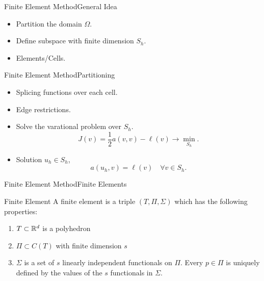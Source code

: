 \begin{frame}{Finite Element Method}{General Idea}
    \begin{itemize}
        \item Partition the domain $\Omega$.
        \item Define subspace with finite dimension $S_h$.
        \item Elements/Cells.
    \end{itemize}
\end{frame}

\begin{frame}{Finite Element Method}{Partitioning}
    \begin{itemize}
        \item Splicing functions over each cell.
        \item Edge restrictions.
        \item Solve the varational problem over $S_h$.
        \begin{equation}
            J(v) = \frac{1}{2} a(v,v) - \ell(v) \rightarrow \min_{S_h}.
        \end{equation}
        \item Solution $u_h \in S_h$,
        \begin{equation}
            a(u_h,v) = \ell(v) \quad \forall v \in S_h.
        \end{equation}
    \end{itemize}
\end{frame}

\begin{frame}{Finite Element Method}{Finite Elements}
    \begin{defn}{Finite Element}
        A finite element is a triple $(T, \Pi,\Sigma)$ which has the following properties:
        \label{def:finite_element}
        \begin{enumerate}
            \item $T\subset \mathbb{R}^d$ is a polyhedron
            \item $\Pi \subset C(T)$ with finite dimension $s$
            \item $\Sigma$ is a set of $s$ linearly independent functionals on $\Pi$. 
            Every $p\in \Pi$ is uniquely defined by the values of the $s$ functionals in $\Sigma$.
        \end{enumerate}
    \end{defn}
\end{frame}

